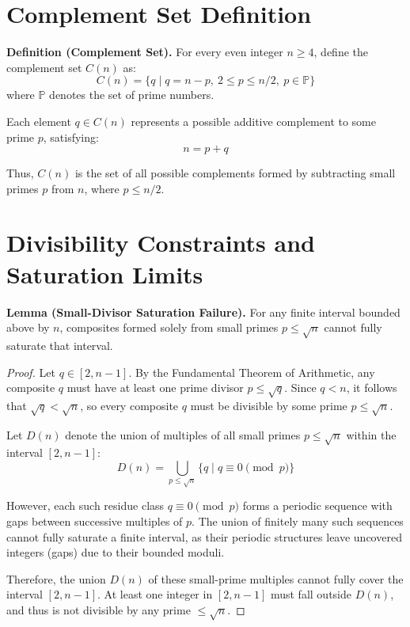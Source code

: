 \documentclass[11pt]{article}
\begin{document}
	
	
	\section{Complement Set Definition}

	
	\textbf{Definition (Complement Set).}  
	For every even integer \( n \geq 4 \), define the complement set \( C(n) \) as:
	\[
	C(n) = \{ q \mid q = n - p,\ 2 \leq p \leq n/2,\ p \in \mathbb{P} \}
	\]
	where \( \mathbb{P} \) denotes the set of prime numbers.
	
	Each element \( q \in C(n) \) represents a possible additive complement to some prime \( p \), satisfying:
	\[
	n = p + q
	\]
	
	Thus, \( C(n) \) is the set of all possible complements formed by subtracting small primes \( p \) from \( n \), where \( p \leq n/2 \).



	\section{Divisibility Constraints and Saturation Limits}
	
	\textbf{Lemma (Small-Divisor Saturation Failure).}  
	For any finite interval bounded above by \( n \), composites formed solely from small primes \( p \leq \sqrt{n} \) cannot fully saturate that interval.
	
	\begin{proof}
		Let \( q \in [2, n-1] \). By the Fundamental Theorem of Arithmetic, any composite \( q \) must have at least one prime divisor \( p \leq \sqrt{q} \). Since \( q < n \), it follows that \( \sqrt{q} < \sqrt{n} \), so every composite \( q \) must be divisible by some prime \( p \leq \sqrt{n} \).
		
		Let \( D(n) \) denote the union of multiples of all small primes \( p \leq \sqrt{n} \) within the interval \([2, n-1]\):
		\[
		D(n) = \bigcup_{p \leq \sqrt{n}} \{ q \mid q \equiv 0 \pmod{p} \}
		\]
		
		However, each such residue class \( q \equiv 0 \pmod{p} \) forms a periodic sequence with gaps between successive multiples of \( p \). The union of finitely many such sequences cannot fully saturate a finite interval, as their periodic structures leave uncovered integers (gaps) due to their bounded moduli.
		
		Therefore, the union \( D(n) \) of these small-prime multiples cannot fully cover the interval \([2, n-1]\). At least one integer in \([2, n-1]\) must fall outside \( D(n) \), and thus is not divisible by any prime \( \leq \sqrt{n} \).
		
	\end{proof}
	
\end{document}
